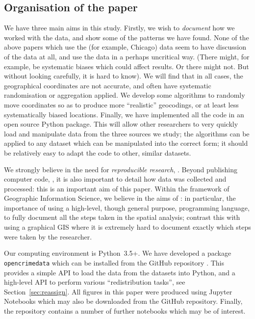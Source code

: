 \documentclass[twoside,a4paper,twocolumn,10pt]{article}
\theoremstyle{plain}
\theoremstyle{definition}
\begin{document}
\subsection{Organisation of the paper}

We have three main aims in this study.  Firstly, we wish to \emph{document} how we worked
with the data, and show some of the patterns we have found.  None of the above papers
which use the (for example, Chicago) data seem
to have discussion of the data at all, and use the data in a perhaps uncritical way.
(There might, for example, be systematic biases which could affect results.  Or there might not.
But without looking carefully, it is hard to know).  We will find that in all cases, the
geographical coordinates are not accurate, and often have systematic randomisation or aggregation
applied.  We develop some algorithms to randomly move coordinates so as to produce more
``realistic'' geocodings, or at least less systematically biased locations.  Finally, we
have implemented all the code in an open source Python package.  This will allow other researchers
to very quickly load and manipulate data from the three sources we study; the algorithms can be
applied to any dataset which can be manipulated into the correct form; it should be relatively
easy to adapt the code to other, similar datasets.

We strongly believe in the need for \emph{reproducible research}, \cite{hl, morin}.
Beyond publishing computer code, \cite{barnes}, it is also important to detail how data was collected
and processed: this is an important aim of this paper.  Within the framework of
Geographic Information Science, we believe in the aims of \cite{ssb}: in particular, the
importance of using a high-level, though general purpose, programming language, to fully
document all the steps taken in the spatial analysis; contrast this with using a graphical
GIS where it is extremely hard to document exactly which steps were taken by the researcher.

Our computing environment is Python~3.5+.  We have developed a package \texttt{opencrimedata}
which can be installed from the GitHub repository \cite{ocd}.
This provides a simple API to load the data from the datasets into Python, and a high-level
API to perform various ``redistribution tasks'', see Section~\ref{sec:reassign}.
All figures in this paper were produced using Jupyter Notebooks which may also be downloaded from
the GitHub repository.  Finally, the repository contains a number of further notebooks which may
be of interest.
\end{document}
